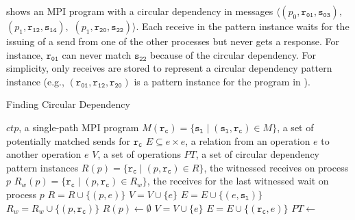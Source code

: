 \examplefigthree

 shows an MPI program with a circular dependency in messages $\langle(p_0, \mathtt{r_{01}}, \mathtt{s_{03}}),$ $(p_1, \mathtt{r_{12}}, \mathtt{s_{14}}),$ $(p_1, \mathtt{r_{20}}, \mathtt{s_{22}})\rangle$. Each receive in the pattern instance waits for the issuing of a send from one of the other processes but never gets a response. For instance, $\mathtt{r_{01}}$ can never match $\mathtt{s_{22}}$ because of the circular dependency. For simplicity, only receives are stored to represent a circular dependency pattern instance (e.g., $(\mathtt{r_{01}}, \mathtt{r_{12}}, \mathtt{r_{20}})$ is a pattern instance for the program in ). 

\begin{algorithm}
\caption{Finding Circular Dependency}\label{algo:circular}
\begin{algorithmic}[1]
\Require $\mathit{ctp}$, a single-path MPI program
\Require $\mathit{M}(\mathtt{r_c}) = \{\mathtt{s_l}\mid(\mathtt{s_l},\mathtt{r_c})\in\mathit{M}\}$, a set of potentially matched sends for $\mathtt{r_c}$
\State $\mathit{E} \subseteq \mathit{e}\times\mathit{e}$, a relation from an operation $\mathit{e}$ to another operation $\mathit{e}$
\State $\mathit{V}$, a set of operations
\State $\mathit{PT}$, a set of circular dependency pattern instances
\State $\mathit{R}(p) = \{\mathtt{r_c}\mid(p,\mathtt{r_c})\in\mathit{R}\}$, the witnessed receives on process $p$
\State $\mathit{R_w}(p) = \{\mathtt{r_c}\mid(p,\mathtt{r_c})\in\mathit{R_w}\}$, the receives for the last witnessed wait on process $p$ 
\State $\mathit{R} = \mathit{R} \cup \{(p,\mathit{e})\}$
\State $\mathit{V} = \mathit{V} \cup \{\mathit{e}\}$
 
\State $\mathit{E} = \mathit{E} \cup \{(\mathit{e},\mathtt{s_l})\}$  
\EndFor
\EndIf
{}
\State $\mathit{R_w} = \mathit{R_w} \cup \{(p,\mathtt{r_c})\}$
\EndFor
\State $\mathit{R}(p) \gets \emptyset$ 
\EndIf
{}
\State $\mathit{V} = \mathit{V} \cup \{\mathit{e}\}$
  
\State $\mathit{E} = \mathit{E} \cup \{(\mathtt{r_c},\mathit{e})\}$
\EndFor
\EndIf
\EndFor
\EndFor
\State $\mathit{PT} \gets$ 
\end{algorithmic}
\end{algorithm}

